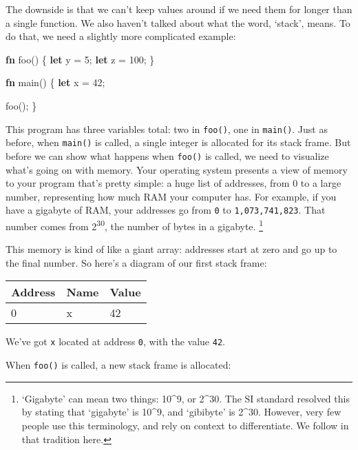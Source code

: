 \documentclass[a4paper,]{book}
\newenvironment{Shaded}{\begin{snugshade}}{\end{snugshade}}
\newcommand{\KeywordTok}[1]{\textcolor[rgb]{0.13,0.29,0.53}{\textbf{{#1}}}}
\newcommand{\DecValTok}[1]{\textcolor[rgb]{0.00,0.00,0.81}{{#1}}}
\newcommand{\NormalTok}[1]{{#1}}
\begin{document}
The downside is that we can't keep values around if we need them for
longer than a single function. We also haven't talked about what the
word, `stack', means. To do that, we need a slightly more complicated
example:

\begin{Shaded}
\begin{Highlighting}[]
\KeywordTok{fn} \NormalTok{foo() \{}
    \KeywordTok{let} \NormalTok{y = }\DecValTok{5}\NormalTok{;}
    \KeywordTok{let} \NormalTok{z = }\DecValTok{100}\NormalTok{;}
\NormalTok{\}}

\KeywordTok{fn} \NormalTok{main() \{}
    \KeywordTok{let} \NormalTok{x = }\DecValTok{42}\NormalTok{;}

    \NormalTok{foo();}
\NormalTok{\}}
\end{Highlighting}
\end{Shaded}

This program has three variables total: two in \texttt{foo()}, one in
\texttt{main()}. Just as before, when \texttt{main()} is called, a
single integer is allocated for its stack frame. But before we can show
what happens when \texttt{foo()} is called, we need to visualize what's
going on with memory. Your operating system presents a view of memory to
your program that's pretty simple: a huge list of addresses, from 0 to a
large number, representing how much RAM your computer has. For example,
if you have a gigabyte of RAM, your addresses go from \texttt{0} to
\texttt{1,073,741,823}. That number comes from 2\textsuperscript{30},
the number of bytes in a gigabyte. \footnote{`Gigabyte' can mean two
  things: 10\^{}9, or 2\^{}30. The SI standard resolved this by stating
  that `gigabyte' is 10\^{}9, and `gibibyte' is 2\^{}30. However, very
  few people use this terminology, and rely on context to differentiate.
  We follow in that tradition here.}

This memory is kind of like a giant array: addresses start at zero and
go up to the final number. So here's a diagram of our first stack frame:

\begin{longtable}[c]{@{}lll@{}}
\toprule
Address & Name & Value\tabularnewline
\midrule
\endhead
0 & x & 42\tabularnewline
\bottomrule
\end{longtable}

We've got \texttt{x} located at address \texttt{0}, with the value
\texttt{42}.

When \texttt{foo()} is called, a new stack frame is allocated:
\end{document}
